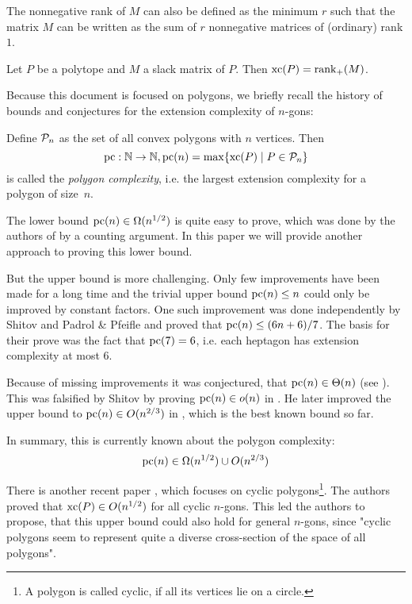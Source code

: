 The nonnegative rank of $M$ can also be defined as the minimum $r$ such that the matrix $M$ can be written as the sum of $r$ nonnegative matrices of (ordinary) rank $1$.

\begin{theorem}
  Let $P$ be a polytope and $M$ a slack matrix of $P$. Then $\xc(P) = \rank_+(M)$.
\end{theorem}

Because this document is focused on polygons, we briefly recall the history of bounds and conjectures for the extension complexity of $n$-gons:

Define $\P_n$ as the set of all convex polygons with $n$ vertices. Then $$\pc:\N \to \N, \pc(n) = \max \{\xc(P) \mid P \in \P_n\}$$ is called the \emph{polygon complexity}, i.e. the largest extension complexity for a polygon of size~$n$.

The lower bound $\pc(n) \in \Omega(n^{1/2})$ is quite easy to prove, which was done by the authors of \cite{fiorini2012extended} by a counting argument. In this paper we will provide another approach to proving this lower bound. 

But the upper bound is more challenging. Only few improvements have been made for a long time and the trivial upper bound $\pc(n) \leq n$ could only be improved by constant factors. One such improvement was done independently by Shitov \cite{shitov2014upper} and Padrol \& Pfeifle \cite{padrol2014polygons} and proved that $\pc(n) \leq (6n+6)/7$. The basis for their prove was the fact that $\pc(7)=6$, i.e. each heptagon has extension complexity at most 6.

Because of missing improvements it was conjectured, that $\pc(n) \in \Theta(n)$ (see \cite{fiorini2012extended}). This was falsified by Shitov by proving $\pc(n) \in o(n)$ in \cite{shitov2014sublinear}. He later improved the upper bound to $\pc(n) \in O(n^{2/3})$ in \cite{shitov2020sublinear}, which is the best known bound so far.

In summary, this is currently known about the polygon complexity:
$$\pc(n) \in \Omega(n^{1/2}) \cup O(n^{2/3})$$

There is another recent paper \cite{kwan2020extension}, which focuses on cyclic polygons\footnote{A polygon is called cyclic, if all its vertices lie on a circle.}. The authors proved that $\xc(P) \in O(n^{1/2})$ for all cyclic $n$-gons. 
This led the authors to propose, that this upper bound could also hold for general $n$-gons, since "cyclic polygons seem to represent quite a diverse cross-section of the space of all polygons".



